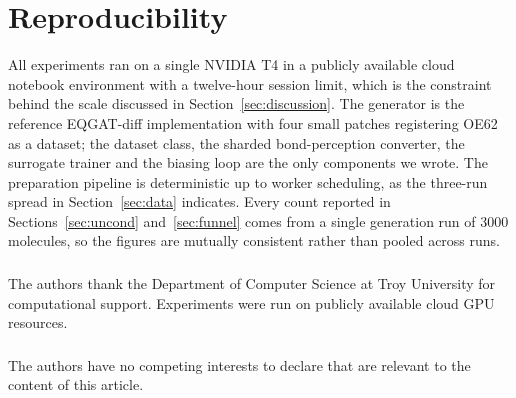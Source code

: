 \documentclass[runningheads]{llncs}
\begin{document}


\section{Reproducibility}

All experiments ran on a single NVIDIA T4 in a publicly available cloud
notebook environment with a twelve-hour session limit, which is the
constraint behind the scale discussed in
Section~\ref{sec:discussion}. The generator is the reference
EQGAT-diff implementation with four small patches registering OE62 as a
dataset; the dataset class, the sharded bond-perception converter, the
surrogate trainer and the biasing loop are the only components we
wrote. The preparation pipeline is deterministic up to worker
scheduling, as the three-run spread in Section~\ref{sec:data}
indicates. Every count reported in Sections~\ref{sec:uncond}
and~\ref{sec:funnel} comes from a single generation run of \num{3000}
molecules, so the figures are mutually consistent rather than pooled
across runs.

\begin{credits}
\subsubsection{\ackname}
The authors thank the Department of Computer Science at Troy University
for computational support. Experiments were run on publicly available
cloud GPU resources.

\subsubsection{\discintname}
The authors have no competing interests to declare that are relevant to
the content of this article.
\end{credits}
\end{document}
